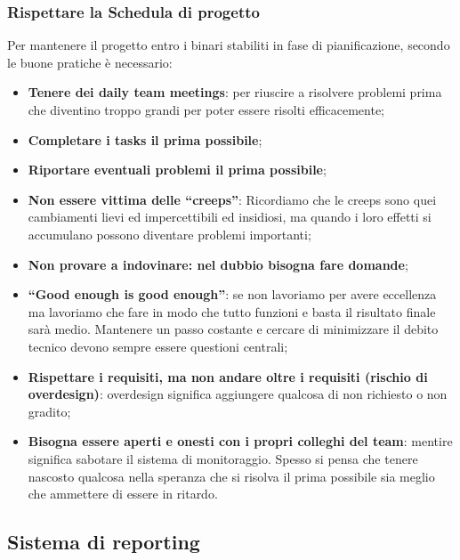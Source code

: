 \subsubsection{Rispettare la Schedula di progetto}
Per mantenere il progetto entro i binari stabiliti in fase di pianificazione, secondo le buone pratiche è necessario:
\begin{itemize}
	\item \textbf{Tenere dei daily team meetings}: per riuscire a risolvere problemi prima che diventino troppo grandi per poter essere risolti efficacemente;
	\item \textbf{Completare i tasks il prima possibile};
	\item \textbf{Riportare eventuali problemi il prima possibile};
	\item \textbf{Non essere vittima delle “creeps”}: Ricordiamo che le creeps sono quei cambiamenti lievi ed impercettibili ed insidiosi, ma quando i loro effetti si accumulano possono diventare problemi importanti;
	\item \textbf{Non provare a indovinare: nel dubbio bisogna fare domande};
	\item \textbf{“Good enough is good enough”}: se non lavoriamo per avere eccellenza ma lavoriamo che fare in modo che tutto funzioni e basta il risultato finale sarà medio. Mantenere un passo costante e cercare di minimizzare il debito tecnico devono sempre essere questioni centrali;
	\item \textbf{Rispettare i requisiti, ma non andare oltre i requisiti (rischio di overdesign)}: overdesign significa aggiungere qualcosa di non richiesto o non gradito;
	\item \textbf{Bisogna essere aperti e onesti con i propri colleghi del team}: mentire significa sabotare il sistema di monitoraggio. Spesso si pensa che tenere nascosto qualcosa nella speranza che si risolva il prima possibile sia meglio che ammettere di essere in ritardo.
\end{itemize}

\subsection{Sistema di reporting}
